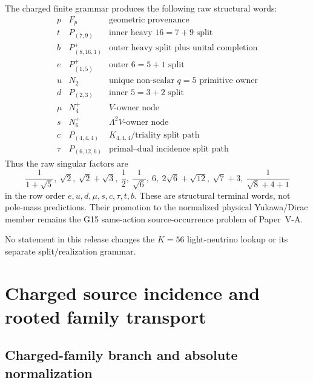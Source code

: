 \documentclass[12pt,a4paper]{article}
\begin{document}
\begin{theorem}
\label{p6:thm:v566-derived-charged-raw-compiler}
The charged finite grammar produces the following raw structural words:
\[
\begin{array}{c|c|c}
p&F_p&\text{geometric provenance}\\ \hline
 t&P_{(7,9)}&\text{inner heavy }16=7+9\text{ split}\\
 b&P_{(8,16,1)}^+&\text{outer heavy split plus unital completion}\\
 e&P_{(1,5)}^+&\text{outer }6=5+1\text{ split}\\
 u&N_2&\text{unique non-scalar }q=5\text{ primitive owner}\\
 d&P_{(2,3)}&\text{inner }5=3+2\text{ split}\\
 \mu&N_4^+&V\text{-owner node}\\
 s&N_6^+&\Lambda^2V\text{-owner node}\\
 c&P_{(4,4,4)}&K_{4,4,4}\text{/triality split path}\\
 \tau&P_{(6,12,6)}&\text{primal--dual incidence split path}
\end{array}
\]
Thus the raw singular factors are
\[
 \boxed{
 \frac1{1+\sqrt5},\ \sqrt2,\ \sqrt2+\sqrt3,\
 \frac12,\ \frac1{\sqrt6},\ 6,\ 2\sqrt6+\sqrt{12},\
 \sqrt7+3,\ \frac1{\sqrt8+4+1}}
\]
in the row order \(e,u,d,\mu,s,c,\tau,t,b\).
These are structural terminal words, not pole-mass predictions.  Their
promotion to the normalized physical Yukawa/Dirac member remains the G15
same-action source-occurrence problem of Paper~V-A.
\end{theorem}

\begin{remark}
\label{p6:rem:v566-neutral-unchanged}
No statement in this release changes the \(K=56\) light-neutrino lookup or
its separate split/realization grammar.
\end{remark}


\section{Charged source incidence and rooted family transport}
\label{p5b:sec:organized-source}
\subsection{Charged-family branch and absolute normalization}
\label{p6:sec:charged-family}
\end{document}
